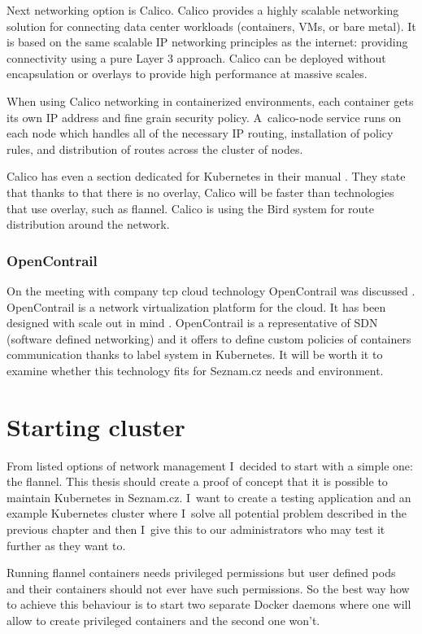 Next networking option is Calico. Calico provides a highly scalable networking solution for connecting data center workloads (containers, VMs, or bare metal). It is based on the same scalable IP networking principles as the internet: providing connectivity using a pure Layer 3 approach. Calico can be deployed without encapsulation or overlays to provide high performance at massive scales.

When using Calico networking in containerized environments, each container gets its own IP address and fine grain security policy. A~calico-node service runs on each node which handles all of the necessary IP routing, installation of policy rules, and distribution of routes across the cluster of nodes.  \cite{calico}

Calico has even a section dedicated for Kubernetes in their manual \cite{calico-kubernetes}. They state that thanks to that there is no overlay, Calico will be faster than technologies that use overlay, such as flannel. Calico is using the Bird \cite{bird} system for route distribution around the network.

\subsubsection{OpenContrail} 

On the meeting with company tcp cloud \cite{tcpcloud} technology OpenContrail was discussed \cite{tcpcloud-opencontrail}. OpenContrail is a network virtualization platform for the cloud. It has been designed with scale out in mind  \cite{opencontrail}. OpenContrail is a representative of SDN (software defined networking) and it offers to define custom policies of containers communication thanks to label system in Kubernetes. It will be worth it to examine whether this technology fits for Seznam.cz needs and environment.

\section{Starting cluster}
From listed options of network management I~decided to start with a simple one: the flannel. This thesis should create a proof of concept that it is possible to maintain Kubernetes in Seznam.cz. I~want to create a testing application and an example Kubernetes cluster where I~solve all potential problem described in the previous chapter and then I~give this to our administrators who may test it further as they want to.

Running flannel containers needs privileged permissions but user defined pods and their containers should not ever have such permissions. So the best way how to achieve this behaviour is to start two separate Docker daemons where one will allow to create privileged containers and the second one won’t.

